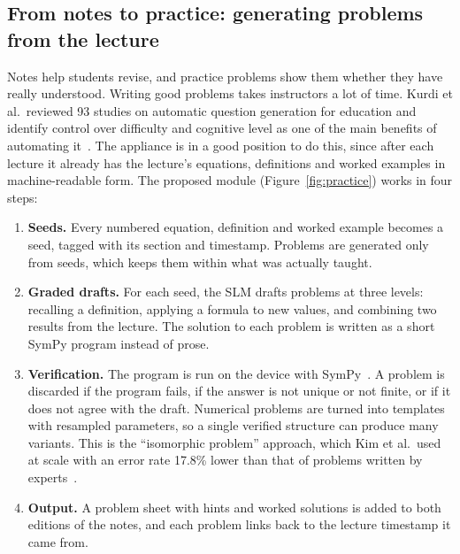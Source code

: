 \documentclass[11pt,a4paper,oneside]{report}
\theoremstyle{definition}
\begin{document}
\subsection{From notes to practice: generating problems from the lecture}
Notes help students revise, and practice problems show them whether they have really understood. Writing good problems takes instructors a lot of time. Kurdi et al.\ reviewed 93 studies on automatic question generation for education and identify control over difficulty and cognitive level as one of the main benefits of automating it~\cite{kurdi2020aqg}. The appliance is in a good position to do this, since after each lecture it already has the lecture's equations, definitions and worked examples in machine-readable form. The proposed module (Figure~\ref{fig:practice}) works in four steps:
\begin{enumerate}
  \item \textbf{Seeds.} Every numbered equation, definition and worked example becomes a seed, tagged with its section and timestamp. Problems are generated only from seeds, which keeps them within what was actually taught.
  \item \textbf{Graded drafts.} For each seed, the SLM drafts problems at three levels: recalling a definition, applying a formula to new values, and combining two results from the lecture. The solution to each problem is written as a short SymPy program instead of prose.
  \item \textbf{Verification.} The program is run on the device with SymPy~\cite{meurer2017sympy}. A problem is discarded if the program fails, if the answer is not unique or not finite, or if it does not agree with the draft. Numerical problems are turned into templates with resampled parameters, so a single verified structure can produce many variants. This is the ``isomorphic problem'' approach, which Kim et al.\ used at scale with an error rate 17.8\% lower than that of problems written by experts~\cite{kim2025blueprints}.
  \item \textbf{Output.} A problem sheet with hints and worked solutions is added to both editions of the notes, and each problem links back to the lecture timestamp it came from.
\end{enumerate}
\end{document}
